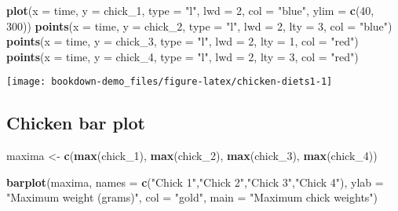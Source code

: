 \documentclass[]{book}
\newenvironment{Shaded}{\begin{snugshade}}{\end{snugshade}}
\newcommand{\DataTypeTok}[1]{\textcolor[rgb]{0.13,0.29,0.53}{#1}}
\newcommand{\DecValTok}[1]{\textcolor[rgb]{0.00,0.00,0.81}{#1}}
\newcommand{\KeywordTok}[1]{\textcolor[rgb]{0.13,0.29,0.53}{\textbf{#1}}}
\newcommand{\NormalTok}[1]{#1}
\newcommand{\StringTok}[1]{\textcolor[rgb]{0.31,0.60,0.02}{#1}}
\begin{document}
\begin{Shaded}
\begin{Highlighting}[]
\KeywordTok{plot}\NormalTok{(}\DataTypeTok{x =}\NormalTok{ time, }\DataTypeTok{y =}\NormalTok{ chick_}\DecValTok{1}\NormalTok{,}
         \DataTypeTok{type =} \StringTok{"l"}\NormalTok{,}
         \DataTypeTok{lwd =} \DecValTok{2}\NormalTok{,}
         \DataTypeTok{col =} \StringTok{"blue"}\NormalTok{,}
         \DataTypeTok{ylim =} \KeywordTok{c}\NormalTok{(}\DecValTok{40}\NormalTok{, }\DecValTok{300}\NormalTok{))}
\KeywordTok{points}\NormalTok{(}\DataTypeTok{x =}\NormalTok{ time, }\DataTypeTok{y =}\NormalTok{ chick_}\DecValTok{2}\NormalTok{,}
         \DataTypeTok{type =} \StringTok{"l"}\NormalTok{,}
         \DataTypeTok{lwd =} \DecValTok{2}\NormalTok{,}
         \DataTypeTok{lty =} \DecValTok{3}\NormalTok{,}
         \DataTypeTok{col =} \StringTok{"blue"}\NormalTok{)}
\KeywordTok{points}\NormalTok{(}\DataTypeTok{x =}\NormalTok{ time, }\DataTypeTok{y =}\NormalTok{ chick_}\DecValTok{3}\NormalTok{,}
         \DataTypeTok{type =} \StringTok{"l"}\NormalTok{,}
         \DataTypeTok{lwd =} \DecValTok{2}\NormalTok{,}
         \DataTypeTok{lty =} \DecValTok{1}\NormalTok{,}
         \DataTypeTok{col =} \StringTok{"red"}\NormalTok{)}
\KeywordTok{points}\NormalTok{(}\DataTypeTok{x =}\NormalTok{ time, }\DataTypeTok{y =}\NormalTok{ chick_}\DecValTok{4}\NormalTok{,}
         \DataTypeTok{type =} \StringTok{"l"}\NormalTok{,}
         \DataTypeTok{lwd =} \DecValTok{2}\NormalTok{,}
         \DataTypeTok{lty =} \DecValTok{3}\NormalTok{,}
         \DataTypeTok{col =} \StringTok{"red"}\NormalTok{)}
\end{Highlighting}
\end{Shaded}

\begin{center}\texttt{[image: bookdown-demo\_files/figure-latex/chicken-diets1-1]} \end{center}

\hypertarget{chicken-bar-plot-1}{%
\subsection{Chicken bar plot}\label{chicken-bar-plot-1}}

\begin{Shaded}
\begin{Highlighting}[]
\NormalTok{maxima <-}\StringTok{ }\KeywordTok{c}\NormalTok{(}\KeywordTok{max}\NormalTok{(chick_}\DecValTok{1}\NormalTok{), }\KeywordTok{max}\NormalTok{(chick_}\DecValTok{2}\NormalTok{), }\KeywordTok{max}\NormalTok{(chick_}\DecValTok{3}\NormalTok{), }\KeywordTok{max}\NormalTok{(chick_}\DecValTok{4}\NormalTok{))}

\KeywordTok{barplot}\NormalTok{(maxima,}
    \DataTypeTok{names =} \KeywordTok{c}\NormalTok{(}\StringTok{"Chick 1"}\NormalTok{,}\StringTok{"Chick 2"}\NormalTok{,}\StringTok{"Chick 3"}\NormalTok{,}\StringTok{"Chick 4"}\NormalTok{),}
    \DataTypeTok{ylab =} \StringTok{"Maximum weight (grams)"}\NormalTok{,}
    \DataTypeTok{col =} \StringTok{"gold"}\NormalTok{,}
    \DataTypeTok{main =} \StringTok{"Maximum chick weights"}\NormalTok{)}
\end{Highlighting}
\end{Shaded}
\end{document}
